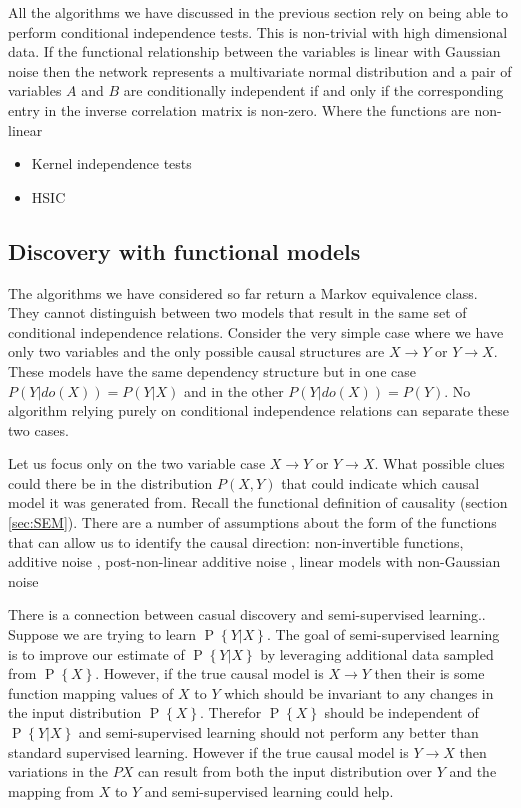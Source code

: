 \documentclass[11pt,a4paper,oneside]{book}
\renewcommand{\P}[1]{\operatorname{P}\left\{#1\right\}}
\theoremstyle{plain}
\theoremstyle{definition}
\begin{document}
All the algorithms we have discussed in the previous section rely on being able to perform conditional independence tests. This is non-trivial with high dimensional data. If the functional relationship between the variables is linear with Gaussian noise then the network represents a multivariate normal distribution and a pair of variables $A$ and $B$ are conditionally independent if and only if the corresponding entry in the inverse correlation matrix is non-zero. Where the functions are non-linear 

\begin{itemize}
\item \cite{Zhang2012} Kernel independence tests
\item HSIC \cite{Gretton2008}
\end{itemize}

\subsection{Discovery with functional models}
The algorithms we have considered so far return a Markov equivalence class. They cannot distinguish between two models that result in the same set of conditional independence relations. Consider the very simple case where we have only two variables and the only possible causal structures are $X \rightarrow Y$ or $Y \rightarrow X$. These models have the same dependency structure but in one case $P(Y|do(X)) = P(Y|X)$ and in the other $P(Y|do(X)) = P(Y)$. No algorithm relying purely on conditional independence relations can separate these two cases. 

Let us focus only on the two variable case $X \rightarrow Y$ or $Y \rightarrow X$. What possible clues could there be in the distribution $P(X,Y)$ that could indicate which causal model it was generated from. Recall the functional definition of causality (section \ref{sec:SEM}). There are a number of assumptions about the form of the functions that can allow us to identify the causal direction: non-invertible functions, additive noise \cite{Hoyer2009}, post-non-linear additive noise \cite{Zhang2008a}, linear models with non-Gaussian noise \cite{Hoyer2012}

There is a connection between casual discovery and semi-supervised learning.\cite{causal anti causal}. Suppose we are trying to learn $\P{Y|X}$. The goal of semi-supervised learning is to improve our estimate of $\P{Y|X}$ by leveraging additional data sampled from $\P{X}$. However, if the true causal model is $X \rightarrow Y$ then their is some function mapping values of $X$ to $Y$ which should be invariant to any changes in the input distribution $\P{X}$. Therefor $\P{X}$ should be independent of $\P{Y|X}$ and semi-supervised learning should not perform any better than standard supervised learning. However if the true causal model is $Y \rightarrow X$ then variations in the $P{X}$ can result from both the input distribution over $Y$ and the mapping from $X$ to $Y$ and semi-supervised learning could help.
\end{document}
